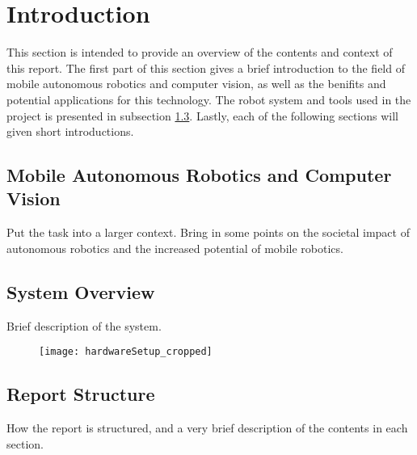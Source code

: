 \chapter{Introduction}
\label{chp:introduction} 

This section is intended to provide an overview of the contents and context of this report. The first part of this section gives a brief introduction to the field of mobile autonomous robotics and computer vision, as well as the benifits and potential applications for this technology. The robot system and tools used in the project is presented in subsection \ref{}. Lastly, each of the following sections will given short introductions.


\section{Mobile Autonomous Robotics and Computer Vision}

Put the task into a larger context. Bring in some points on the societal impact of autonomous robotics and the increased potential of mobile robotics.  

\section{System Overview}

Brief description of the system.

\begin{figure}
	\texttt{[image: hardwareSetup\_cropped]}
\end{figure}

\section{Report Structure}
How the report is structured, and a very brief description of the contents in each section.